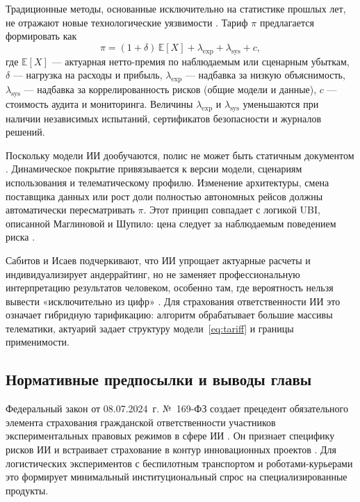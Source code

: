 \documentclass[a4paper,14pt]{extarticle}
\begin{document}
Традиционные методы, основанные исключительно на статистике прошлых лет, не отражают новые технологические уязвимости \cite{zezina}. Тариф $\pi$ предлагается формировать как
\begin{equation}
\pi = (1+\delta)\, \mathbb{E}[X] + \lambda_{\mathrm{exp}} + \lambda_{\mathrm{sys}} + c,
\label{eq:tariff}
\end{equation}
где $\mathbb{E}[X]$ --- актуарная нетто-премия по наблюдаемым или сценарным убыткам, $\delta$ --- нагрузка на расходы и прибыль, $\lambda_{\mathrm{exp}}$ --- надбавка за низкую объяснимость, $\lambda_{\mathrm{sys}}$ --- надбавка за коррелированность рисков (общие модели и данные), $c$ --- стоимость аудита и мониторинга. Величины $\lambda_{\mathrm{exp}}$ и $\lambda_{\mathrm{sys}}$ уменьшаются при наличии независимых испытаний, сертификатов безопасности и журналов решений.

Поскольку модели ИИ дообучаются, полис не может быть статичным документом \cite{zezina}. Динамическое покрытие привязывается к версии модели, сценариям использования и телематическому профилю. Изменение архитектуры, смена поставщика данных или рост доли полностью автономных рейсов должны автоматически пересматривать $\pi$. Этот принцип совпадает с логикой UBI, описанной Маглиновой и Шупило: цена следует за наблюдаемым поведением риска \cite{maglinova}.

Сабитов и Исаев подчеркивают, что ИИ упрощает актуарные расчеты и индивидуализирует андеррайтинг, но не заменяет профессиональную интерпретацию результатов человеком, особенно там, где вероятность нельзя вывести «исключительно из цифр» \cite{sabitov}. Для страхования ответственности ИИ это означает гибридную тарификацию: алгоритм обрабатывает большие массивы телематики, актуарий задает структуру модели~\eqref{eq:tariff} и границы применимости.

\subsection{Нормативные предпосылки и выводы главы}

Федеральный закон от 08.07.2024~г. №~169-ФЗ создает прецедент обязательного элемента страхования гражданской ответственности участников экспериментальных правовых режимов в сфере ИИ \cite{fz169}. Он признает специфику рисков ИИ и встраивает страхование в контур инновационных проектов \cite{zezina}. Для логистических экспериментов с беспилотным транспортом и роботами-курьерами это формирует минимальный институциональный спрос на специализированные продукты.
\end{document}
